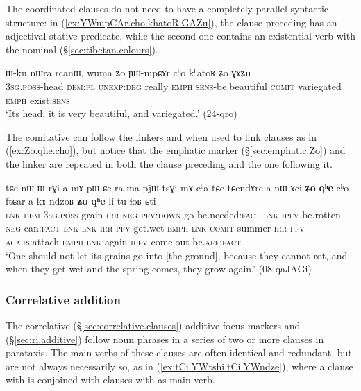  The coordinated clauses do not need to have a completely parallel syntactic structure: in (\ref{ex:YWmpCAr.cho.khatoR.GAZu}), the clause preceding  has an adjectival stative predicate, while the second one contains an existential verb with the nominal  (§\ref{sec:tibetan.colours}).
 
\begin{exe}
\ex \label{ex:YWmpCAr.cho.khatoR.GAZu}
\gll   ɯ-ku nɯra rcanɯ, wuma ʑo ɲɯ-mpɕɤr cʰo kʰatoʁ ʑo ɣɤʑu \\
\textsc{3sg}.\textsc{poss}-head \textsc{dem}:\textsc{pl} \textsc{unexp}:\textsc{deg} really \textsc{emph} \textsc{sens}-be.beautiful \textsc{comit} variegated \textsc{emph} exist:\textsc{sens} \\
\glt `Its head, it is very beautiful, and variegated.' (24-qro)
\end{exe}

The comitative  can follow the linkers  and  when used to link clauses as in (\ref{ex:Zo.qhe.cho}), but notice that the emphatic marker (§\ref{sec:emphatic.Zo}) and the linker  are repeated in both the clause preceding  and the one following it.

\begin{exe}
\ex \label{ex:Zo.qhe.cho}
\gll tɕe nɯ ɯ-rɣi a-mɤ-pɯ-ɕe ra ma pjɯ-tsɣi mɤ-cʰa tɕe tɕendɤre a-nɯ-ɤci \textbf{ʑo} \textbf{qʰe} cʰo ftɕar a-kɤ-ndzoʁ \textbf{ʑo} \textbf{qʰe} li tu-ɬoʁ ɕti \\
\textsc{lnk} \textsc{dem} \textsc{3sg}.\textsc{poss}-grain \textsc{irr}-\textsc{neg}-\textsc{pfv}:\textsc{down}-go be.needed:\textsc{fact} \textsc{lnk} \textsc{ipfv}-be.rotten \textsc{neg}-can:\textsc{fact} \textsc{lnk} \textsc{lnk} \textsc{irr}-\textsc{pfv}-get.wet \textsc{emph} \textsc{lnk} \textsc{comit} summer \textsc{irr}-\textsc{pfv}-\textsc{acaus}:attach \textsc{emph} \textsc{lnk} again \textsc{ipfv}-come.out be.\textsc{aff}:\textsc{fact} \\
\glt `One should not let its grains go into [the ground], because they cannot rot, and when they get wet and the spring comes, they grow again.' (08-qaJAGi)
\end{exe}

 \subsubsection{Correlative addition} \label{sec:correlative.addition}
The correlative (§\ref{sec:correlative.clauses}) additive focus markers  and  (§\ref{sec:ri.additive}) follow noun phrases in a series of two or more clauses in parataxis. The main verbs of these clauses are often identical and redundant, but are not always necessarily so, as in (\ref{ex:tCi.YWtshi.tCi.YWndze}), where a clause with  is conjoined with clauses with  as main verb.

